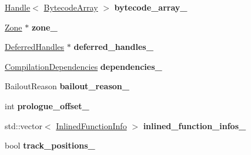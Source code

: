 \begin{DoxyCompactItemize}
\item 
\hyperlink{classv8_1_1internal_1_1_handle}{Handle}$<$ \hyperlink{classv8_1_1internal_1_1_bytecode_array}{Bytecode\+Array} $>$ {\bfseries bytecode\+\_\+array\+\_\+}\hypertarget{classv8_1_1internal_1_1_compilation_info_a56931fe02e9057165384192a496b8419}{}\label{classv8_1_1internal_1_1_compilation_info_a56931fe02e9057165384192a496b8419}

\item 
\hyperlink{classv8_1_1internal_1_1_zone}{Zone} $\ast$ {\bfseries zone\+\_\+}\hypertarget{classv8_1_1internal_1_1_compilation_info_a4c29ff1c8d5fc97afa19b057af98d8c2}{}\label{classv8_1_1internal_1_1_compilation_info_a4c29ff1c8d5fc97afa19b057af98d8c2}

\item 
\hyperlink{classv8_1_1internal_1_1_deferred_handles}{Deferred\+Handles} $\ast$ {\bfseries deferred\+\_\+handles\+\_\+}\hypertarget{classv8_1_1internal_1_1_compilation_info_a8bae549b3bc95f51d3518ba1af53d982}{}\label{classv8_1_1internal_1_1_compilation_info_a8bae549b3bc95f51d3518ba1af53d982}

\item 
\hyperlink{classv8_1_1internal_1_1_compilation_dependencies}{Compilation\+Dependencies} {\bfseries dependencies\+\_\+}\hypertarget{classv8_1_1internal_1_1_compilation_info_a8212d4c06e8d8b25d336e27e9af0c9dc}{}\label{classv8_1_1internal_1_1_compilation_info_a8212d4c06e8d8b25d336e27e9af0c9dc}

\item 
Bailout\+Reason {\bfseries bailout\+\_\+reason\+\_\+}\hypertarget{classv8_1_1internal_1_1_compilation_info_a630618ca5743f9b51284acf0e191b615}{}\label{classv8_1_1internal_1_1_compilation_info_a630618ca5743f9b51284acf0e191b615}

\item 
int {\bfseries prologue\+\_\+offset\+\_\+}\hypertarget{classv8_1_1internal_1_1_compilation_info_a822629057bf7986f7e498d90dcbca6f0}{}\label{classv8_1_1internal_1_1_compilation_info_a822629057bf7986f7e498d90dcbca6f0}

\item 
std\+::vector$<$ \hyperlink{structv8_1_1internal_1_1_inlined_function_info}{Inlined\+Function\+Info} $>$ {\bfseries inlined\+\_\+function\+\_\+infos\+\_\+}\hypertarget{classv8_1_1internal_1_1_compilation_info_a28057ca2328a8599ffb270e16bf61e7a}{}\label{classv8_1_1internal_1_1_compilation_info_a28057ca2328a8599ffb270e16bf61e7a}

\item 
bool {\bfseries track\+\_\+positions\+\_\+}\hypertarget{classv8_1_1internal_1_1_compilation_info_a86333a826c22475046f3f5b47b7137a0}{}\label{classv8_1_1internal_1_1_compilation_info_a86333a826c22475046f3f5b47b7137a0}


\end{DoxyCompactItemize}
